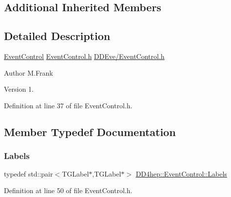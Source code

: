 \subsection*{Additional Inherited Members}


\subsection{Detailed Description}
\hyperlink{class_d_d4hep_1_1_event_control}{Event\+Control} \hyperlink{_event_control_8h}{Event\+Control.\+h} \hyperlink{_event_control_8h}{D\+D\+Eve/\+Event\+Control.\+h}

\begin{DoxyAuthor}{Author}
M.\+Frank 
\end{DoxyAuthor}
\begin{DoxyVersion}{Version}
1. 
\end{DoxyVersion}


Definition at line 37 of file Event\+Control.\+h.



\subsection{Member Typedef Documentation}
\hypertarget{class_d_d4hep_1_1_event_control_a12b653cc77607d8916f8a5ec009036ed}{}\label{class_d_d4hep_1_1_event_control_a12b653cc77607d8916f8a5ec009036ed} 
\subsubsection{\texorpdfstring{Labels}{Labels}}
{\footnotesize\ttfamily typedef std\+::pair$<$T\+G\+Label$\ast$,T\+G\+Label$\ast$$>$ \hyperlink{class_d_d4hep_1_1_event_control_a12b653cc77607d8916f8a5ec009036ed}{D\+D4hep\+::\+Event\+Control\+::\+Labels}\hspace{0.3cm}{\ttfamily [private]}}



Definition at line 50 of file Event\+Control.\+h.

\hypertarget{class_d_d4hep_1_1_event_control_a8195e2f8755ede7627abeaaacd0155e2}{}\label{class_d_d4hep_1_1_event_control_a8195e2f8755ede7627abeaaacd0155e2} 
